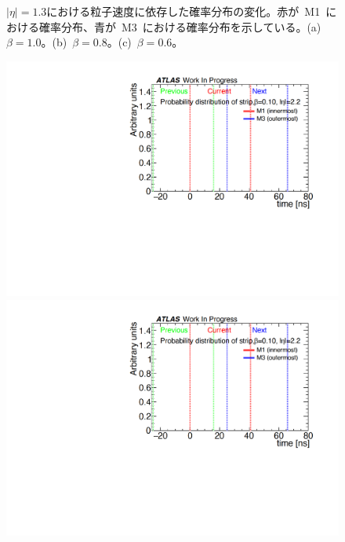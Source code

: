 \begin{figure}[H]
\begin{minipage}{0.33\hsize}
    \subcaption{}
    \end{minipage}
    \caption[$|\eta|=1.3$における粒子速度に依存した確率分布の変化]{$|\eta|=1.3$における粒子速度に依存した確率分布の変化。赤が~M1~における確率分布、青が~M3~における確率分布を示している。(a)~$\beta=1.0$。(b)~$\beta=0.8$。(c)~$\beta=0.6$。}\label{fig:recbeta}
\end{figure}

\begin{figure}[H]
    \begin{minipage}{0.33\hsize}
    \centering   
    \includegraphics[width=\textwidth,page=11]{img/rec/rec_e2.2_s.pdf}
    \subcaption{}
    \end{minipage}
    \begin{minipage}{0.33\hsize}
    \centering   
    \includegraphics[width=\textwidth,page=9]{img/rec/rec_e2.2_s.pdf}

\end{minipage}
\end{figure}
